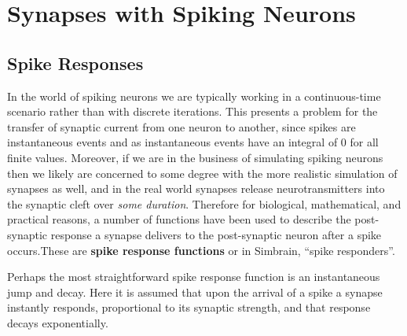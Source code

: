 
\section{Synapses with Spiking Neurons}


\subsection{Spike Responses}

In the world of spiking neurons we are typically working in a continuous-time scenario rather than with discrete iterations. This presents a problem for the transfer of synaptic current from one neuron to another, since spikes are instantaneous events and as instantaneous events have an integral of $0$ for all finite values. Moreover, if we are in the business of simulating spiking neurons then we likely are concerned to some degree with the more realistic simulation of synapses as well, and in the real world synapses release neurotransmitters into the synaptic cleft over \emph{some duration}. Therefore for biological, mathematical, and practical reasons, a number of functions have been used to describe the post-synaptic response a synapse delivers to the post-synaptic neuron after a spike occurs.These are \textbf{spike response functions} or in Simbrain, ``spike responders''. 

Perhaps the most straightforward spike response function is an instantaneous jump and decay. Here it is assumed that upon the arrival of a spike a synapse instantly responds, proportional to its synaptic strength, and that response decays exponentially.

